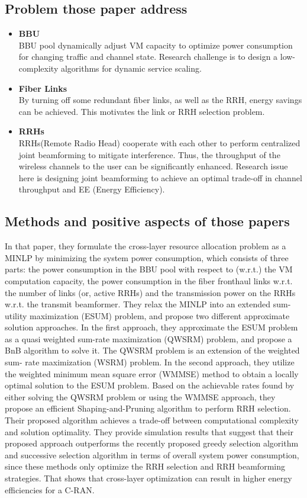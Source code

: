 \documentclass[paper=a4paper,12pt]{article}
\begin{document}
\subsection{Problem those paper address}
\begin{itemize}
  \item \textbf{BBU}\\
    BBU pool dynamically adjust VM capacity to optimize power consumption for changing traffic and channel state. Research challenge is to design a low-complexity algorithms for dynamic service scaling.
  \item \textbf{Fiber Links}\\
    By turning off some redundant fiber links, as well as the RRH, energy savings can be achieved. This motivates the link or RRH selection problem.
  \item \textbf{RRHs}\\
    RRHs(Remote Radio Head) cooperate with each other to perform centralized joint beamforming to mitigate interference. Thus, the throughput of the wireless channels to the user can be significantly enhanced. Research issue here is designing joint beamforming to achieve an optimal trade-off in channel throughput and EE (Energy Efficiency).
\end{itemize}
\subsection{Methods and positive aspects of those papers}
In that paper, they formulate the cross-layer resource allocation problem as a MINLP by minimizing the system power consumption, which consists of three parts: the power consumption in the BBU pool with respect to (w.r.t.) the VM computation capacity, the power consumption in the fiber fronthaul links w.r.t. the number of links (or, active RRHs) and the transmission power on the RRHs w.r.t. the transmit beamformer. They relax the MINLP into an extended sum-utility maximization (ESUM) problem, and propose two different approximate solution approaches. In the first approach, they approximate the ESUM problem as a quasi weighted sum-rate maximization (QWSRM) problem, and propose a BnB algorithm to solve it. The QWSRM problem is an extension of the weighted sum- rate maximization (WSRM) problem. In the second approach, they utilize the weighted minimum mean square error (WMMSE) method to obtain a locally optimal solution to the ESUM problem. Based on the achievable rates found by either solving the QWSRM problem or using the WMMSE approach, they propose an efficient Shaping-and-Pruning algorithm to perform RRH selection. Their proposed algorithm achieves a trade-off between computational complexity and solution optimality. They provide simulation results that suggest that their proposed approach outperforms the recently proposed greedy selection algorithm and successive selection algorithm in terms of overall system power consumption, since these methods only optimize the RRH selection and RRH beamforming strategies. That shows that cross-layer optimization can result in higher energy efficiencies for a C-RAN.
\end{document}
